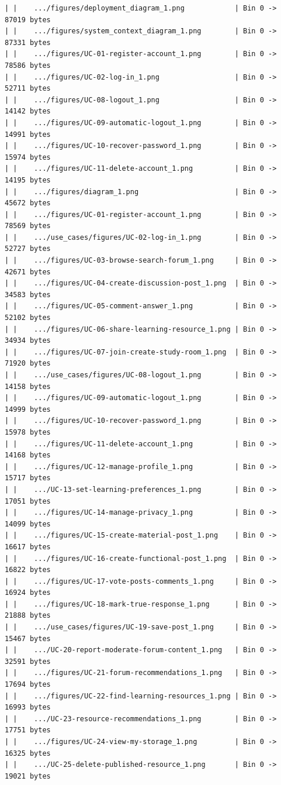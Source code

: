\documentclass[12pt]{article}
\begin{document}
\begin{lstlisting}[numbers=none,breaklines=true]
| |    .../figures/deployment_diagram_1.png            | Bin 0 -> 87019 bytes
| |    .../figures/system_context_diagram_1.png        | Bin 0 -> 87331 bytes
| |    .../figures/UC-01-register-account_1.png        | Bin 0 -> 78586 bytes
| |    .../figures/UC-02-log-in_1.png                  | Bin 0 -> 52711 bytes
| |    .../figures/UC-08-logout_1.png                  | Bin 0 -> 14142 bytes
| |    .../figures/UC-09-automatic-logout_1.png        | Bin 0 -> 14991 bytes
| |    .../figures/UC-10-recover-password_1.png        | Bin 0 -> 15974 bytes
| |    .../figures/UC-11-delete-account_1.png          | Bin 0 -> 14195 bytes
| |    .../figures/diagram_1.png                       | Bin 0 -> 45672 bytes
| |    .../figures/UC-01-register-account_1.png        | Bin 0 -> 78569 bytes
| |    .../use_cases/figures/UC-02-log-in_1.png        | Bin 0 -> 52727 bytes
| |    .../figures/UC-03-browse-search-forum_1.png     | Bin 0 -> 42671 bytes
| |    .../figures/UC-04-create-discussion-post_1.png  | Bin 0 -> 34583 bytes
| |    .../figures/UC-05-comment-answer_1.png          | Bin 0 -> 52102 bytes
| |    .../figures/UC-06-share-learning-resource_1.png | Bin 0 -> 34934 bytes
| |    .../figures/UC-07-join-create-study-room_1.png  | Bin 0 -> 71920 bytes
| |    .../use_cases/figures/UC-08-logout_1.png        | Bin 0 -> 14158 bytes
| |    .../figures/UC-09-automatic-logout_1.png        | Bin 0 -> 14999 bytes
| |    .../figures/UC-10-recover-password_1.png        | Bin 0 -> 15978 bytes
| |    .../figures/UC-11-delete-account_1.png          | Bin 0 -> 14168 bytes
| |    .../figures/UC-12-manage-profile_1.png          | Bin 0 -> 15717 bytes
| |    .../UC-13-set-learning-preferences_1.png        | Bin 0 -> 17051 bytes
| |    .../figures/UC-14-manage-privacy_1.png          | Bin 0 -> 14099 bytes
| |    .../figures/UC-15-create-material-post_1.png    | Bin 0 -> 16617 bytes
| |    .../figures/UC-16-create-functional-post_1.png  | Bin 0 -> 16822 bytes
| |    .../figures/UC-17-vote-posts-comments_1.png     | Bin 0 -> 16924 bytes
| |    .../figures/UC-18-mark-true-response_1.png      | Bin 0 -> 21888 bytes
| |    .../use_cases/figures/UC-19-save-post_1.png     | Bin 0 -> 15467 bytes
| |    .../UC-20-report-moderate-forum-content_1.png   | Bin 0 -> 32591 bytes
| |    .../figures/UC-21-forum-recommendations_1.png   | Bin 0 -> 17694 bytes
| |    .../figures/UC-22-find-learning-resources_1.png | Bin 0 -> 16993 bytes
| |    .../UC-23-resource-recommendations_1.png        | Bin 0 -> 17751 bytes
| |    .../figures/UC-24-view-my-storage_1.png         | Bin 0 -> 16325 bytes
| |    .../UC-25-delete-published-resource_1.png       | Bin 0 -> 19021 bytes

\end{lstlisting}
\end{document}
